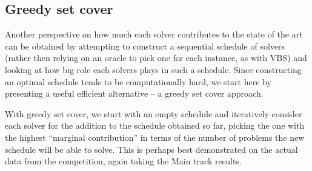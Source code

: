 \documentclass{elsarticle}
\begin{document}
\subsection{Greedy set cover}
Another perspective on how much each solver contributes to the state of the art
can be obtained by attempting to construct a sequential schedule of solvers 
(rather then relying on an oracle to pick one for each instance, as with VBS)
and looking at how big role each solvers plays in such a schedule. Since constructing 
an optimal schedule tends to be computationally hard, we start here by 
presenting a useful efficient alternative -- a greedy set cover approach.

With greedy set cover, we start with an empty schedule and iteratively consider 
each solver for the addition to the schedule obtained so far, picking the one
with the highest ``marginal contribution'' in terms of the number of problems
the new schedule will be able to solve. This is perhaps best demonstrated on
the actual data from the competition, again taking the Main track results. 
\end{document}
